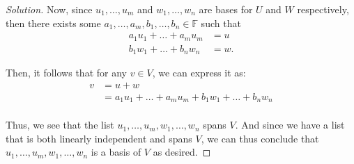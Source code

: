 \documentclass{article}
\newenvironment{solution}{\begin{proof}[Solution]}{\end{proof}}
\begin{document}
\begin{solution}
		Now, since $u_{1}, \ldots, u_{m}$ and $w_{1}, \ldots, w_{n}$ are bases for $U$ and $W$ respectively, then there exists some $a_{1}, \ldots, a_{m}, b_{1}, \ldots, b_{n} \in \mathbb{F}$ such that
		\begin{align*}
			a_{1}u_{1} + \ldots + a_{m}u_{m} &= u \\
			b_{1}w_{1} + \ldots + b_{n}w_{n} &= w.
		\end{align*}
		
		Then, it follows that for any $v \in V$, we can express it as:
		\begin{align*}
			v &= u + w \\
			&= a_{1}u_{1} + \ldots + a_{m}u_{m} + b_{1}w_{1} + \ldots + b_{n}w_{n} \\
		\end{align*}
		
		Thus, we see that the list $u_{1}, \ldots, u_{m}, w_{1}, \ldots, w_{n}$ spans $V$. And since we have a list that is both linearly independent and spans $V$, we can thus conclude that $u_{1}, \ldots, u_{m}, w_{1}, \ldots, w_{n}$ is a basis of $V$ as desired.
	\end{solution}
	
\end{document}
